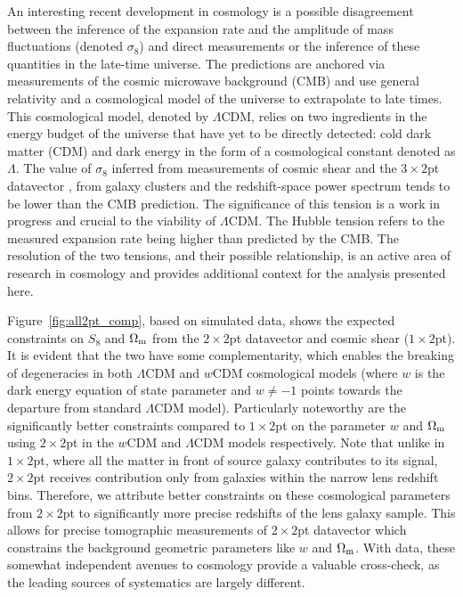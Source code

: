 \documentclass[aps, prd,twocolumn,superscriptaddress,nofootinbib,preprintnumbers]{revtex4-1}
\begin{document}


An interesting recent development in cosmology is a possible disagreement between the inference of the expansion rate and the amplitude of mass fluctuations (denoted $\sigma_8$) and direct measurements or the inference of these quantities in the late-time universe. The predictions are anchored via measurements of the cosmic microwave background (CMB) and use general relativity and a cosmological model of the universe to extrapolate to late times. This cosmological model, denoted by $\Lambda$CDM, relies on two ingredients in the energy budget of the universe that have yet to be directly detected: cold dark matter (CDM) and dark energy in the form of a cosmological constant denoted as $\Lambda$. The value of $\sigma_8$ inferred from measurements of cosmic shear and the $3\times 2$pt datavector \citep{Abbott_2018,Troxel_2018, Heymans_2021, Hikage_2019, y3-3x2ptkp, y3-cosmicshear1, y3-cosmicshear2}, from galaxy clusters \citep{Abbott_2020_clusters,To_2021} and the redshift-space power spectrum \citep{Philcox_2020} tends to be lower than the CMB prediction. The significance of this tension is a work in progress and crucial to the viability of $\Lambda$CDM. The Hubble tension refers to the measured expansion rate being higher than predicted by the CMB. The resolution of the two tensions, and their possible relationship, is an active area of research in cosmology and provides additional context for the analysis presented here. 

Figure~\ref{fig:all2pt_comp}, based on simulated data, shows the expected constraints on $S_8$ and $\Omega_{\rm m}$ from the $2\times2$pt datavector and cosmic shear ($1\times 2$pt). It is evident that the two have some complementarity, which enables the breaking of degeneracies in both $\Lambda$CDM and $w$CDM cosmological models (where $w$ is the dark energy equation of state parameter and $w \neq -1$ points towards the departure from standard $\Lambda$CDM model). Particularly noteworthy are the significantly better constraints compared to $1\times 2$pt on the parameter $w$ and $\Omega_{\rm m}$ using $2\times2$pt in the $w$CDM and $\Lambda$CDM models respectively. Note that unlike in $1\times2$pt, where all the matter in front of source galaxy contributes to its signal, $2\times2$pt receives contribution only from galaxies within the narrow lens redshift bins. Therefore, we attribute better constraints on these cosmological parameters from $2\times2$pt to significantly more precise redshifts of the lens galaxy sample. This allows for precise tomographic measurements of $2\times2$pt datavector which constrains the background geometric parameters like $w$ and $\Omega_{\rm m}$. With data, these somewhat independent avenues to cosmology provide a valuable cross-check, as the leading sources of systematics are largely different. 
\end{document}
